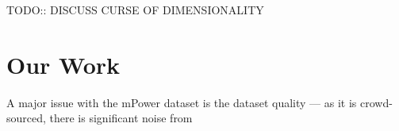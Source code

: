 \documentclass{article}
\def\specialcellright#1{$\vtop{\halign{\hfil##\hfil\strut\cr#1\cr}}$}
\begin{document}
%
%


TODO:: DISCUSS CURSE OF DIMENSIONALITY


\section{Our Work}
A major issue with the mPower dataset is the dataset quality --- as it is crowd-sourced, there is significant noise from





\end{document}
